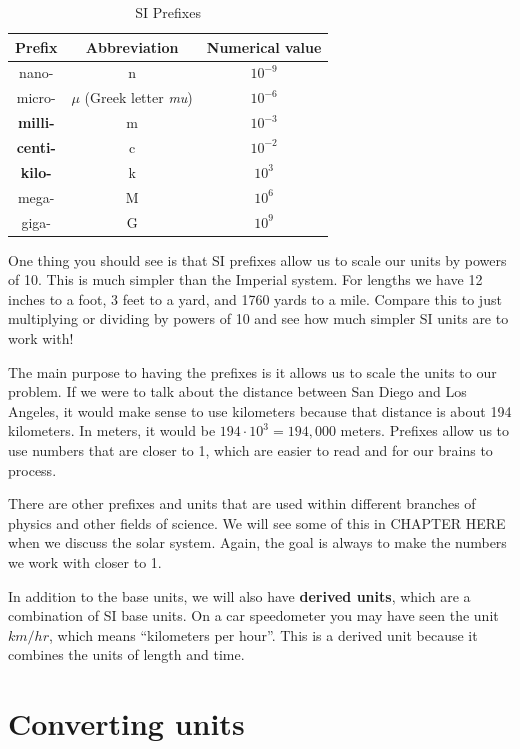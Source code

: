 \documentclass[12pt]{book}
\begin{document}
\begin{table}[b]
\large
\centering
\caption{SI Prefixes}
\begin{tabular}{ c | c | c }
	\hline
	Prefix & Abbreviation & Numerical value \\
	\hline
	nano- & n & $10^{-9}$ \\
	micro- & $\mu$ (Greek letter \textit{mu}) & $10^{-6}$ \\
	\textbf{milli-} & m & $10^{-3}$ \\
	\textbf{centi-} & c & $10^{-2}$ \\
	\textbf{kilo-} & k & $10^3$ \\
	mega- & M & $10^6$ \\
	giga- & G & $10^9$ \\
	\hline
\end{tabular}

\label{SIPrefixes}
\end{table}

One thing you should see is that SI prefixes allow us to scale our units by powers of 10. This is much simpler than the Imperial system. For lengths we have 12 inches to a foot, 3 feet to a yard, and 1760 yards to a mile. Compare this to just multiplying or dividing by powers of 10 and see how much simpler SI units are to work with!

The main purpose to having the prefixes is it allows us to scale the units to our problem. If we were to talk about the distance between San Diego and Los Angeles, it would make sense to use kilometers because that distance is about 194 kilometers. In meters, it would be $194 \cdot 10^3 = 194,000$ meters. Prefixes allow us to use numbers that are closer to 1, which are easier to read and for our brains to process. 

There are other prefixes and units that are used within different branches of physics and other fields of science. We will see some of this in CHAPTER HERE when we discuss the solar system. Again, the goal is always to make the numbers we work with closer to 1.

In addition to the base units, we will also have \textbf{derived units}, which are a combination of SI base units. On a car speedometer you may have seen the unit $km/hr$, which means ``kilometers per hour''. This is a derived unit because it combines the units of length and time.


\section{Converting units}
\end{document}
